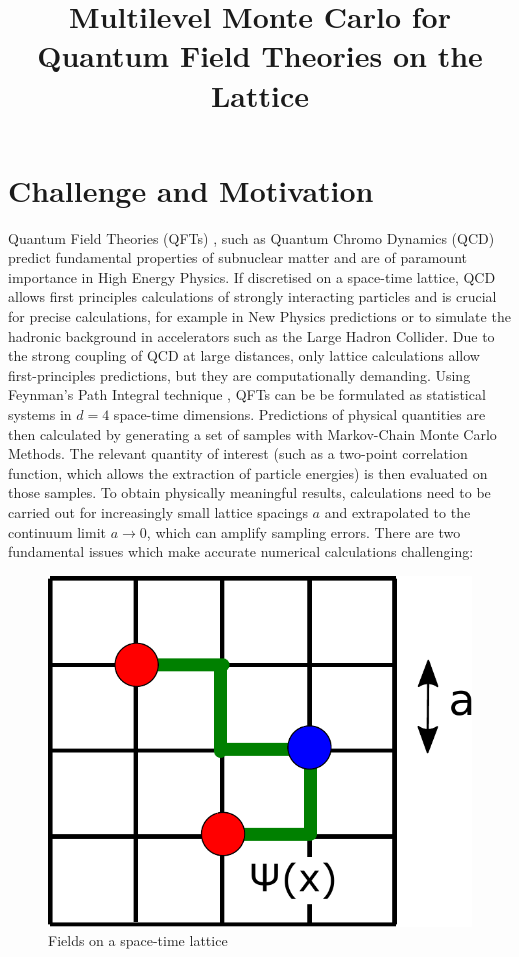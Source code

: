 \documentclass[11pt]{article}
\title{Multilevel Monte Carlo for Quantum Field Theories on the Lattice}
\begin{document}
\maketitle
\section{Challenge and Motivation}
Quantum Field Theories (QFTs) \cite{Peskin1995}, such as Quantum Chromo Dynamics (QCD) predict fundamental properties of subnuclear matter and are of paramount importance in High Energy Physics. If discretised on a space-time lattice, QCD allows first principles calculations of strongly interacting particles and is crucial for precise calculations, for example in New Physics predictions or to simulate the hadronic background in accelerators such as the Large Hadron Collider. 
Due to the strong coupling of QCD at large distances, only lattice calculations allow first-principles predictions, but they are computationally demanding. Using Feynman's Path Integral technique \cite{Feynman2010}, QFTs can be be formulated as statistical systems in $d=4$ space-time dimensions. Predictions of physical quantities are then calculated by generating a set of samples with Markov-Chain Monte Carlo Methods. The relevant quantity of interest (such as a two-point correlation function, which allows the extraction of particle energies) is then evaluated on those samples. To obtain physically meaningful results, calculations need to be carried out for increasingly small lattice spacings $a$ and extrapolated to the continuum limit $a\rightarrow 0$, which can amplify sampling errors. There are two fundamental issues which make accurate numerical calculations challenging:
\begin{figure}
  \begin{center}
    \includegraphics[width=0.3\linewidth]{lattice.pdf}
    \caption{Fields on a space-time lattice}
    \label{fig:lattice}
  \end{center}
\end{figure}
\end{document}
